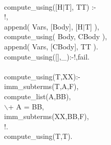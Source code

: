 \documentclass[11pt]{report}
\begin{document}
\begin{sf}
\begin{tabbing}
\\[-0.15ex]
compute\_\hspace{0.1em}using([H$\mid$T], TT) :-\\[-0.15ex]
\hspace{2em}!,\\[-0.15ex]
\hspace{2em}append( Vars, [Body], [H$\mid$T] ),\\[-0.15ex]
\hspace{2em}compute\_\hspace{0.1em}using( Body, CBody ),\\[-0.15ex]
\hspace{2em}append( Vars, [CBody], TT ).\\[-0.15ex]
compute\_\hspace{0.1em}using([],\_\hspace{0.1em}):-!,fail.\\[-0.7ex]
\\[-0.15ex]
compute\_\hspace{0.1em}using(T,XX):-\\[-0.15ex]
\hspace{2em}imm\_\hspace{0.1em}subterms(T,A,F),\\[-0.15ex]
\hspace{2em}compute\_\hspace{0.1em}list(A,BB),\\[-0.15ex]
\hspace{2em}$\backslash$+ A = BB,\\[-0.15ex]
\hspace{2em}imm\_\hspace{0.1em}subterms(XX,BB,F),\\[-0.15ex]
\hspace{2em}!.\\[-0.15ex]
compute\_\hspace{0.1em}using(T,T).\\[-0.7ex]

\end{tabbing}\end{sf}
\end{document}
